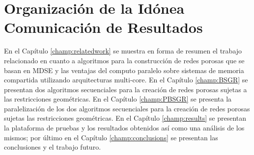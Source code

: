 \section{Organización de la Idónea Comunicación de Resultados}

En el Capítulo \ref{champ:relatedwork} se muestra en forma de resumen el trabajo relacionado en cuanto a algoritmos para la construcción de redes porosas que se basan en MDSE y las ventajas del computo paralelo sobre sistemas de memoria compartida utilizando arquitecturas multi-core. En el Capítulo \ref{champ:BSGR} se presentan dos algoritmos secuenciales para la creación de redes porosas sujetas a las restricciones geométricas. En el Capítulo \ref{champ:PBSGR} se presenta la paralelización de los dos algoritmos secuenciales para la creación de redes porosas sujetas las restricciones geométricas. En el Capítulo \ref{champ:results} se presentan la plataforma de pruebas y los resultados obtenidos así como una análisis de los mismos; por último en el Capítulo \ref{champ:conclusions} se presentan las conclusiones y el trabajo futuro.